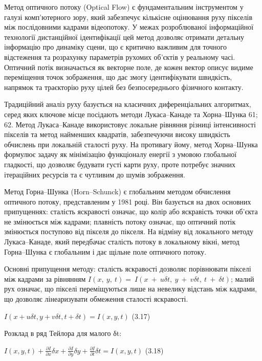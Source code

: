 \documentclass[
]{article}
\begin{document}
Метод оптичного потоку (Optical Flow) є фундаментальним інструментом у галузі комп'ютерного зору, який забезпечує кількісне оцінювання руху пікселів між послідовними кадрами відеопотоку. У межах розроблюваної інформаційної технології дистанційної ідентифікації цей метод дозволяє отримати детальну інформацію про динаміку сцени, що є критично важливим для точного відстеження та розрахунку параметрів рухомих об'єктів у реальному часі. Оптичний потік визначається як векторне поле, де кожен вектор описує видиме переміщення точок зображення, що дає змогу ідентифікувати швидкість, напрямок та траєкторію руху цілей без безпосереднього фізичного контакту.

Традиційний аналіз руху базується на класичних диференціальних алгоритмах, серед яких ключове місце посідають методи Лукаса--Канаде та Хорна--Шунка 61; 62. Метод Лукаса--Канаде використовує локальне рівняння різниці інтенсивності пікселів та метод найменших квадратів, забезпечуючи високу швидкість обчислень при локальній сталості руху. На противагу йому, метод Хорна--Шунка формулює задачу як мінімізацію функціоналу енергії з умовою глобальної гладкості, що дозволяє будувати густі карти руху, проте потребує значних ітераційних ресурсів та є чутливим до шумів зображення.

Метод Горна--Шунка (Horn--Schunck) є глобальним методом обчислення оптичного потоку, представленим у 1981 році. Він базується на двох основних припущеннях: сталість яскравості означає, що колір або яскравість точки об'єкта не змінюється між кадрами; плавність потоку означає, що оптичний потік змінюється поступово від пікселя до пікселя. На відміну від локального методу Лукаса--Канаде, який передбачає сталість потоку в локальному вікні, метод Горна--Шунка є глобальним і дає щільне поле оптичного потоку.

Основні припущення методу: сталість яскравості дозволяє порівнювати пікселі між кадрами за рівнянням \(I(x,\ y,\ t) = \ I(x\  + \ u\delta t,\ y\  + \ v\delta t,\ t\  + \ \delta t)\); малий рух означає, що пікселі переміщуються лише на невелику відстань між кадрами, що дозволяє лінеаризувати обмеження сталості яскравості.

\(I(x + u\delta t,y + v\delta t,t + \delta t) = I(x,y,t)\) (3.17)

Розклад в ряд Тейлора для малого δt:

\(I(x,y,t) + \frac{\partial I}{\partial x}\delta x + \frac{\partial I}{\partial y}\delta y + \frac{\partial I}{\partial t}\delta t = I(x,y,t)\) (3.18)
\end{document}
